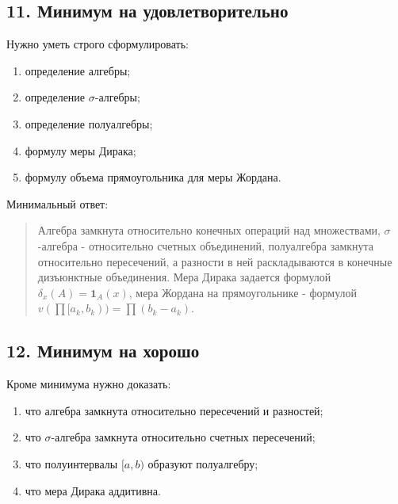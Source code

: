 \documentclass[
  11pt,
  a4paper,
]{article}
\providecommand{\tightlist}{%
  \setlength{\itemsep}{0pt}\setlength{\parskip}{0pt}}
\begin{document}
\subsection{11. Минимум на
удовлетворительно}\label{ux43cux438ux43dux438ux43cux443ux43c-ux43dux430-ux443ux434ux43eux432ux43bux435ux442ux432ux43eux440ux438ux442ux435ux43bux44cux43dux43e}

Нужно уметь строго сформулировать:

\begin{enumerate}
\def\labelenumi{\arabic{enumi}.}
\tightlist
\item
  определение алгебры;
\item
  определение \(\sigma\)-алгебры;
\item
  определение полуалгебры;
\item
  формулу меры Дирака;
\item
  формулу объема прямоугольника для меры Жордана.
\end{enumerate}

Минимальный ответ:

\begin{quote}
Алгебра замкнута относительно конечных операций над множествами,
\(\sigma\)-алгебра - относительно счетных объединений, полуалгебра
замкнута относительно пересечений, а разности в ней раскладываются в
конечные дизъюнктные объединения. Мера Дирака задается формулой
\(\delta_x(A)=\mathbf 1_A(x)\), мера Жордана на прямоугольнике -
формулой \(v(\prod[a_k,b_k))=\prod(b_k-a_k)\).
\end{quote}

\subsection{12. Минимум на
хорошо}\label{ux43cux438ux43dux438ux43cux443ux43c-ux43dux430-ux445ux43eux440ux43eux448ux43e}

Кроме минимума нужно доказать:

\begin{enumerate}
\def\labelenumi{\arabic{enumi}.}
\tightlist
\item
  что алгебра замкнута относительно пересечений и разностей;
\item
  что \(\sigma\)-алгебра замкнута относительно счетных пересечений;
\item
  что полуинтервалы \([a,b)\) образуют полуалгебру;
\item
  что мера Дирака аддитивна.
\end{enumerate}
\end{document}
